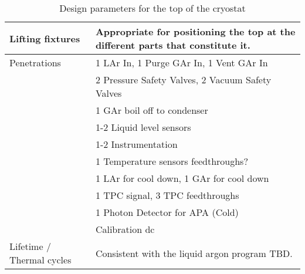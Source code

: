 \begin{table}[htpb]
\begin{tabular}{|p{}|p{}|}
Lifting fixtures  & Appropriate for positioning the top at the different parts that constitute it. \\ \hline
Penetrations  &  1 LAr In, 1 Purge GAr In, 1 Vent GAr In \\ 
& 2 Pressure Safety Valves, 2 Vacuum Safety Valves \\ 
& 1 GAr boil off to condenser \\ 
& 1-2 Liquid level sensors \\ 
& 1-2 Instrumentation \\ 
& 1 Temperature sensors feedthroughs? \\ 
& 1 LAr for cool down, 1 GAr for cool down \\ 
& 1 TPC signal, 3 TPC feedthroughs \\
& 1 Photon Detector for APA (Cold) \\
& Calibration dc\\ \hline
Lifetime / Thermal cycles  & Consistent with the liquid argon program TBD. \\ \hline
\end{tabular}
\caption{Design parameters for the top of the cryostat}
\label{tbl:cryostat-top-parameters}
\end{table}


